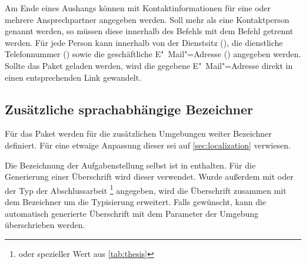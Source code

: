 \begin{Declaration}{}
\begin{Declaration}{}
\begin{Declaration}{}
\begin{Declaration}{}
\printdeclarationlist%
%
Am Ende eines Aushangs können mit  Kontaktinformationen 
für eine oder mehrere Ansprechpartner angegeben werden. Soll mehr als eine 
Kontaktperson genannt werden, so müssen diese innerhalb des Befehls
 mit dem Befehl  getrennt werden. Für jede 
Person kann innerhalb von  der Dienstsitz 
(), die dienstliche Telefonnummer () sowie die 
geschäftliche E"~Mail"=Adresse () angegeben werden. Sollte das 
Paket  geladen werden, wird die gegebene E"~Mail"=Adresse 
direkt in einen entsprechenden Link gewandelt.
\end{Declaration}
\end{Declaration}
\end{Declaration}
\end{Declaration}


\subsection{Zusätzliche sprachabhängige Bezeichner}
Für das Paket  werden für die zusätzlichen 
Umgebungen weiter Bezeichner definiert. Für eine etwaige Anpassung dieser sei 
auf \autoref{sec:localization} verwiesen.

\begin{Declaration}{}
\begin{Declaration}{}
\printdeclarationlist%
%
Die Bezeichnung der Aufgabenstellung selbst ist in  enthalten. 
Für die Generierung einer Überschrift wird dieser verwendet. Wurde außerdem mit 
 oder  der Typ der Abschlussarbeit%
\footnote{%
   oder spezieller Wert aus \autoref{tab:thesis}
}
angegeben, wird die Überschrift zusammen mit dem Bezeichner 
um die Typisierung erweitert. Falls gewünscht, kann die automatisch generierte 
Überschrift mit dem Parameter  der Umgebung 
 überschrieben werden.
\end{Declaration}
\end{Declaration}


